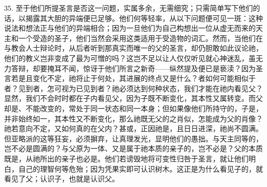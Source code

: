 35. 至于他们所提圣言是否这一问题，实属多余，无需细究；只需简单写下他们的话，以揭露其大胆的异端便已足够。他们何等轻率，从以下问题便可见一斑：这种说法和想法正与他们的异端相合；因为一旦他们为自己构想出一位从虚无而来的天主和一个受造的圣子，他们当然会采用这类适用于受造物的词汇。然而，当他们在与教会人士辩论时，从后者听到那真实而唯一的父的圣言，却仍胆敢如此议论祂，他们的教义岂非变成了最为可憎的吗？这岂不足以让人仅仅听见就心神迷乱，虽无力答辩，却要掩耳不闻，惊讶于他们所言之新奇——纵然提及便已是亵渎？因为圣言若是且变化不定，祂将止于何处，其进展的终点又是什么？者如何可能相似于者？见到者，怎可视为已见到者？祂必须达到何种状态，我们才能在祂内看见父？显然，我们不会时时都在子内看见父，因为子既不断变化，其本性又属转变。而父却是、不能改变的，常处于同一状态和同一本身；但如果像他们所持守的，子是，并非始终如一，其本性又不断变化，那么祂既无父的之肖似，怎能成为父的肖像？祂若意向不定，又如何真的在父内？甚或，正因祂是，且日日进深，祂尚不圆满。但亚略派的这等狂妄，必须摒弃，让真理发光，显明他们的愚拙。与天主同等的，岂不必是圆满的？与父原为一体、又是属于祂本质的亲子的，岂不必是？父的本质既是，从祂所出的亲子也必是。他们若谤毁地将可变性归咎于圣言，就让他们明白，自己的理智何等危殆；因为凭果实即可认识树木。这正是为什么看见子的，就看见了父；认识子，也就是认识父。\par

